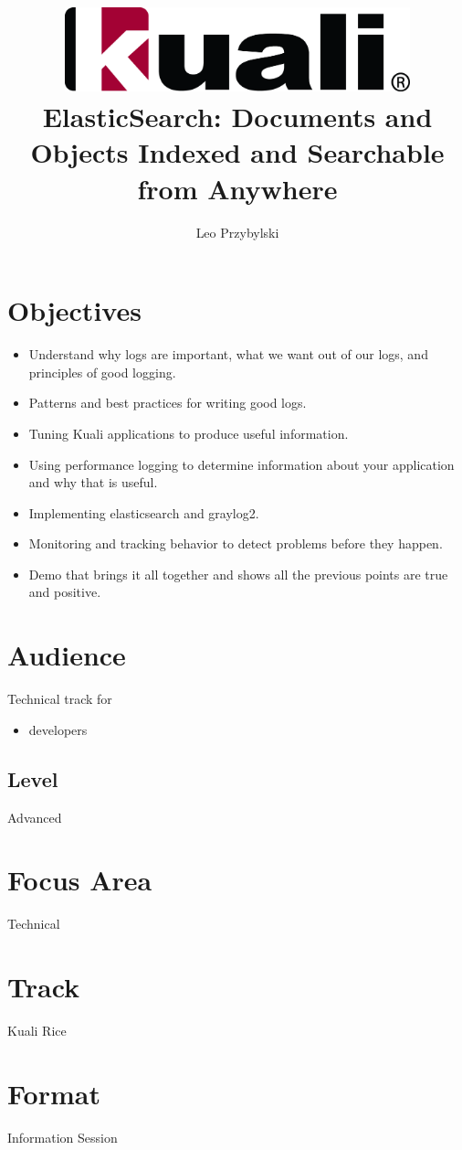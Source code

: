 \documentclass[12pt,notitlepage]{article}
\author{Leo Przybylski}
\title{\includegraphics[width=0.75\textwidth]{kuali_base.png}\\ElasticSearch:
Documents and Objects Indexed and Searchable from Anywhere}
\date{}
\begin{document}
\maketitle
{}

\section{Objectives}
\begin{itemize}
    \item Understand why logs are important, what we want out of our
      logs, and principles of good logging. 
    \item Patterns and best practices for writing good logs. 
    \item Tuning Kuali applications to produce useful information. 
    \item Using performance logging to determine information about
      your application and why that is useful. 
    \item Implementing elasticsearch and graylog2. 
    \item Monitoring and tracking behavior to detect problems before
      they happen. 
    \item Demo that brings it all together and shows all the previous
      points are true and positive.
\end{itemize}

\section{Audience}
Technical track for
\begin{itemize}
\item developers
\end{itemize}


\subsection{Level}
Advanced

\section{Focus Area}
Technical

\section{Track}
Kuali Rice

\section{Format}
Information Session
\end{document}
